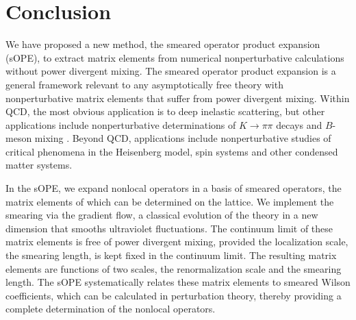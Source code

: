 \section{Conclusion}

We have proposed a new method, the smeared operator product expansion (sOPE), 
to extract matrix elements from numerical nonperturbative calculations without 
power divergent mixing. The smeared operator product expansion is a general 
framework relevant to any asymptotically free theory with nonperturbative 
matrix elements that suffer from power divergent mixing. Within QCD, the most 
obvious application is to deep inelastic scattering, but other applications 
include nonperturbative determinations of $K\rightarrow \pi\pi$ decays 
\cite{Dawson:1997ic,Detmold:2005gg} and $B$-meson mixing 
\cite{Monahan:2014xra}. Beyond QCD, applications include nonperturbative 
studies 
of critical phenomena in the Heisenberg model, spin systems and other condensed 
matter systems.

In the sOPE, we expand nonlocal operators in a basis of smeared operators, 
the matrix elements of which can be determined on the lattice. We implement the 
smearing via the gradient flow, a 
classical evolution of the theory in a new dimension that smooths ultraviolet 
fluctuations. The continuum limit of these matrix elements is free of power 
divergent mixing, provided the localization scale, the smearing length, is kept 
fixed in the continuum limit. The resulting matrix elements are functions of 
two 
scales, the renormalization scale and the smearing length. The sOPE 
systematically relates these matrix elements to smeared Wilson coefficients, 
which can be calculated in perturbation theory, thereby providing a complete 
determination of the nonlocal operators.
